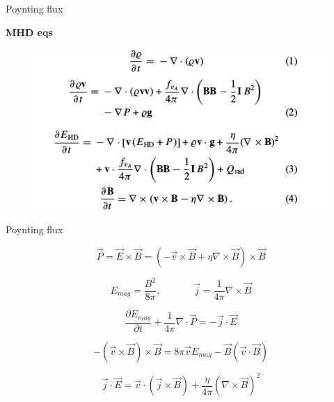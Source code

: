 \documentclass{beamer}
\begin{document}
\newcommand{\tikzAngleOfLine}{\tikz@AngleOfLine}
  \def\tikz@AngleOfLine(#1)(#2)#3{%
  \pgfmathanglebetweenpoints{%
    \pgfpointanchor{#1}{center}}{%
    \pgfpointanchor{#2}{center}}
  \pgfmathsetmacro{#3}{\pgfmathresult}%
  }



\begin{frame}{Poynting flux}

\bf{MHD eqs} 
 
\begin{figure}[H]
 \centering
 \includegraphics[scale=0.6]{eqs.png}
\end{figure}



\end{frame}

\begin{frame}{Poynting flux}

\begin{equation} \nonumber
\vec{P} =  \vec{E} \times \vec{B}   =  (- \vec{v} \times \vec{B}  + \eta \nabla \times \vec{B}) \times \vec{B}
\end{equation}

\begin{equation} \nonumber
E_{mag} = \frac{B^2}{8 \pi} , \;\;\;\; \;\;\;\; \;\;\;\;  \vec{j} = \frac{1}{4 \pi} \nabla \times \vec{B}
\end{equation}

\begin{equation} \nonumber
\frac{\partial E_{mag}}{\partial t} + \frac{1}{4 \pi} \nabla \cdot \vec{P} = -\vec{j} \cdot \vec{E}
\end{equation}

\begin{equation} \nonumber
- (\vec{v} \times \vec{B}) \times \vec{B}=  8 \pi \vec{v} E_{mag} -  \vec{B}(\vec{v} \cdot \vec{B})  
\end{equation}


\begin{equation} \nonumber
\vec{j} \cdot \vec{E} = \vec{v} \cdot \left( \vec{j} \times \vec{B} \right) + \frac{\eta}{4 \pi} \left ( \nabla \times \vec{B} \right )^2
\end{equation}

\end{frame}
\end{document}
